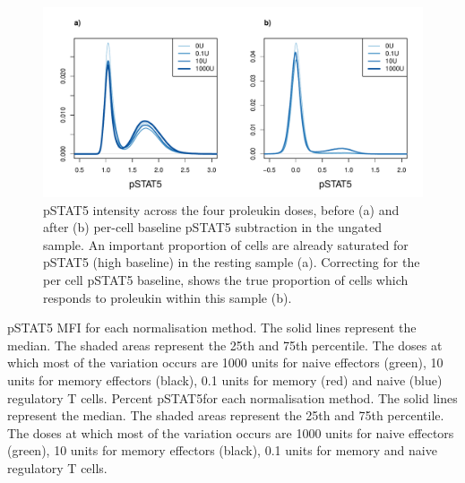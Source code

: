 \begin{figure}[h]
\centering
\includegraphics[scale=.5]{IL2/figures/pstat5-baseline-relative.pdf}
{ pSTAT5 intensity across the four proleukin doses, before (a) and after (b) per-cell baseline pSTAT5 subtraction in the ungated sample.}
{
  An important proportion of cells are already saturated for pSTAT5 (high baseline) in the resting sample (a).
  Correcting for the per cell pSTAT5 baseline, shows the true proportion of cells which responds to proleukin within this sample (b).
}
\end{figure}
{ pSTAT5 MFI for each normalisation method.  }
{
  The solid lines represent the median.
  The shaded areas represent the 25th and 75th percentile.
  The doses at which most of the variation occurs are 1000 units for naive effectors (green),
  10 units for memory effectors (black), 0.1 units for memory (red) and naive (blue) regulatory T cells.
}
{ Percent pSTAT5\positive for each normalisation method. }
{
  The solid lines represent the median.
  The shaded areas represent the 25th and 75th percentile.
  The doses at which most of the variation occurs are 1000 units for naive effectors (green),
  10 units for memory effectors (black), 0.1 units for memory and naive regulatory T cells.
}
